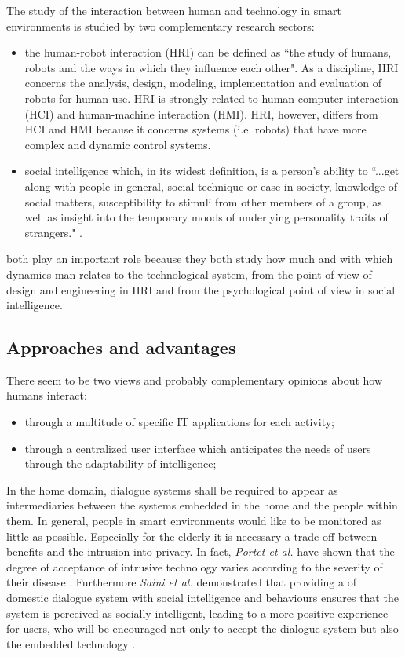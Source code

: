 \documentclass{thesisreport}
\begin{document}
 The study of the interaction between human and technology in smart environments is studied by two complementary research sectors:
 \begin{itemize}
    \item the human-robot interaction (HRI) can be defined as ``the study of humans, robots and the ways in which they influence each other". As a discipline, HRI concerns the analysis, design, modeling, implementation and evaluation of robots for human use.
    HRI is strongly related to human-computer interaction (HCI) and human-machine interaction (HMI). HRI, however, differs from HCI and HMI because it concerns systems (i.e. robots) that have more complex and dynamic control systems.
     
    \item social intelligence which, in its widest definition, is a person's ability to ``...get along with people in general, social technique or ease in society, knowledge of social matters, susceptibility to stimuli from other members of a group, as well as insight into the temporary moods of underlying personality traits of strangers." \cite{vernon1933some}.
 \end{itemize}

 both play an important role because they both study how much and with which dynamics man relates to the technological system, from the point of view of design and engineering in HRI and from the psychological point of view in social intelligence.

 \subsection{Approaches and advantages}
 There seem to be two views and probably complementary opinions about how humans interact:
 \begin{itemize}
     \item through a multitude of specific IT applications for each activity;
     \item through a centralized user interface which anticipates the needs of users through the adaptability of intelligence;
 \end{itemize}
 In the home domain, dialogue systems shall be required to appear as intermediaries between the systems embedded in the home and the people within them.
 In general, people in smart environments would like to be monitored as little as possible. Especially for the elderly it is necessary a trade-off between benefits and the intrusion into privacy. In fact, \textit{Portet et al.} have shown that the degree of acceptance of intrusive technology varies according to the severity of their disease \cite{portet2013design}. 
 Furthermore \textit{Saini et al.} demonstrated that providing a  of domestic dialogue system with social intelligence and behaviours ensures that the system is perceived as socially intelligent, leading to a more positive experience for users, who will be encouraged not only to accept the dialogue system but also the embedded technology \cite{saini2005benefits}.
 
\end{document}
